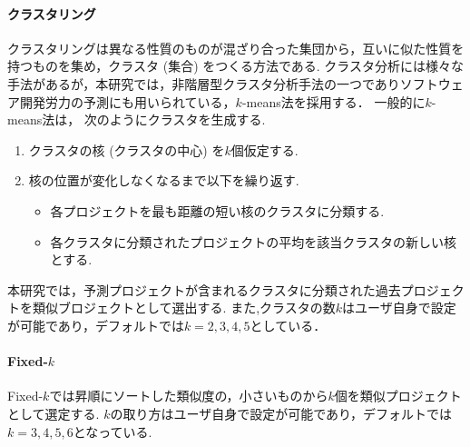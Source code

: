 \paragraph{クラスタリング \quad \\}
クラスタリング\cite{Hai2022}は異なる性質のものが混ざり合った集団から，互いに似た性質を持つものを集め，クラスタ (集合) をつくる方法である. クラスタ分析には様々な手法があるが，本研究では，非階層型クラスタ分析手法の一つでありソフトウェア開発労力の予測にも用いられている，$k$-means法を採用する．
一般的に$k$-means法は， 次のようにクラスタを生成する.
\begin{enumerate}
  \item クラスタの核 (クラスタの中心) を$k$個仮定する.
  \item 核の位置が変化しなくなるまで以下を繰り返す.
  \begin{itemize}
    \item 各プロジェクトを最も距離の短い核のクラスタに分類する.
    \item 各クラスタに分類されたプロジェクトの平均を該当クラスタの新しい核とする.
  \end{itemize}
\end{enumerate}
本研究では，予測プロジェクトが含まれるクラスタに分類された過去プロジェクトを類似ブロジェクトとして選出する.
また,クラスタの数$k$はユーザ自身で設定が可能であり，デフォルトでは$k=2,3,4,5$としている．
\paragraph{Fixed-$k$ \quad \\}
Fixed-$k$では昇順にソートした類似度の，小さいものから$k$個を類似プロジェクトとして選定する.
$k$の取り方はユーザ自身で設定が可能であり，デフォルトでは$k=3,4,5,6$となっている.
